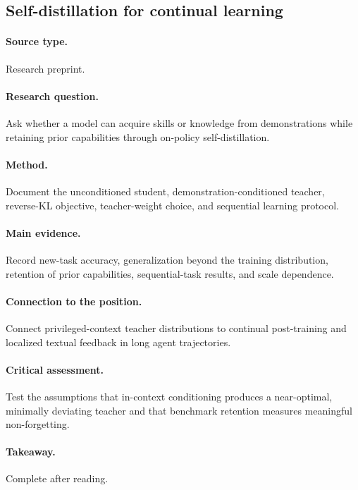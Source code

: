 \subsection{Self-distillation for continual learning
\citep{shenfeld2026selfdistillation}}
\paragraph{Source type.} Research preprint.
\paragraph{Research question.} Ask whether a model can acquire skills or knowledge from demonstrations while retaining prior capabilities through on-policy self-distillation.
\paragraph{Method.} Document the unconditioned student, demonstration-conditioned teacher, reverse-KL objective, teacher-weight choice, and sequential learning protocol.
\paragraph{Main evidence.} Record new-task accuracy, generalization beyond the training distribution, retention of prior capabilities, sequential-task results, and scale dependence.
\paragraph{Connection to the position.} Connect privileged-context teacher distributions to continual post-training and localized textual feedback in long agent trajectories.
\paragraph{Critical assessment.} Test the assumptions that in-context conditioning produces a near-optimal, minimally deviating teacher and that benchmark retention measures meaningful non-forgetting.
\paragraph{Takeaway.} Complete after reading.
